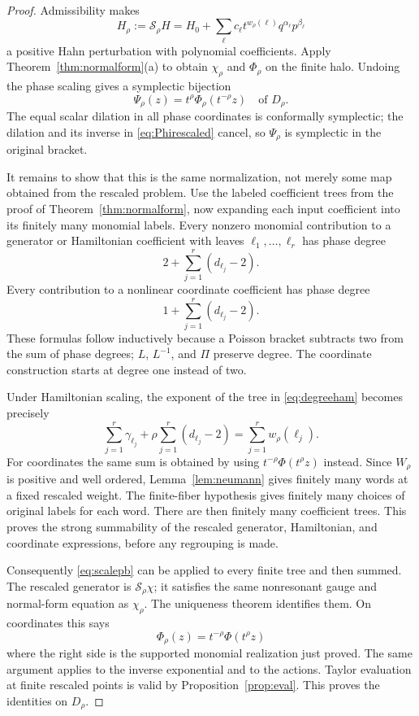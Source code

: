 \documentclass[11pt,letterpaper]{article}
\numberwithin{equation}{section}
\theoremstyle{definition}
\theoremstyle{remark}
\begin{document}
\begin{proof}
Admissibility makes
\[
 H_\rho:=\mathscr S_\rho H
 =H_0+\sum_\ell c_\ell t^{w_\rho(\ell)}q^{\alpha_\ell}p^{\beta_\ell}
\]
a positive Hahn perturbation with polynomial coefficients. Apply
Theorem~\ref{thm:normalform}(a) to obtain $\chi_\rho$ and $\Phi_\rho$ on
the finite halo. Undoing the phase scaling gives a symplectic bijection
\begin{equation}\label{eq:Phirescaled}
 \Psi_\rho(z)=t^\rho\Phi_\rho(t^{-\rho}z)
 \quad\text{of }D_\rho.
\end{equation}
The equal scalar dilation in all phase coordinates is conformally
symplectic; the dilation and its inverse in \eqref{eq:Phirescaled} cancel,
so $\Psi_\rho$ is symplectic in the original bracket.

It remains to show that this is the same normalization, not merely some
map obtained from the rescaled problem. Use the labeled coefficient trees
from the proof of Theorem~\ref{thm:normalform}, now expanding each input
coefficient into its finitely many monomial labels. Every nonzero monomial
contribution to a generator or Hamiltonian coefficient with leaves
$\ell_1,\ldots,\ell_r$ has phase degree
\begin{equation}\label{eq:degreeham}
 2+\sum_{j=1}^r(d_{\ell_j}-2).
\end{equation}
Every contribution to a nonlinear coordinate coefficient has phase degree
\begin{equation}\label{eq:degreecoord}
 1+\sum_{j=1}^r(d_{\ell_j}-2).
\end{equation}
These formulas follow inductively because a Poisson bracket subtracts two
from the sum of phase degrees; $L$, $L^{-1}$, and $\Pi$ preserve degree.
The coordinate construction starts at degree one instead of two.

Under Hamiltonian scaling, the exponent of the tree in
\eqref{eq:degreeham} becomes precisely
\[
 \sum_{j=1}^r\gamma_{\ell_j}
    +\rho\sum_{j=1}^r(d_{\ell_j}-2)
 =\sum_{j=1}^r w_\rho(\ell_j).
\]
For coordinates the same sum is obtained by using
$t^{-\rho}\Phi(t^\rho z)$ instead. Since $W_\rho$ is positive and well
ordered, Lemma~\ref{lem:neumann} gives finitely many words at a fixed
rescaled weight. The finite-fiber hypothesis gives finitely many choices
of original labels for each word. There are then finitely many coefficient
trees. This proves the strong summability of the rescaled generator,
Hamiltonian, and coordinate expressions, before any regrouping is made.

Consequently \eqref{eq:scalepb} can be applied to every finite tree and then
summed. The rescaled generator is $\mathscr S_\rho\chi$; it satisfies the
same nonresonant gauge and normal-form equation as $\chi_\rho$. The
uniqueness theorem identifies them. On coordinates this says
\[
 \Phi_\rho(z)=t^{-\rho}\Phi(t^\rho z)
\]
where the right side is the supported monomial realization just proved.
The same argument applies to the inverse exponential and to the actions.
Taylor evaluation at finite rescaled points is valid by
Proposition~\ref{prop:eval}. This proves the identities on $D_\rho$.


\end{proof}
\end{document}
